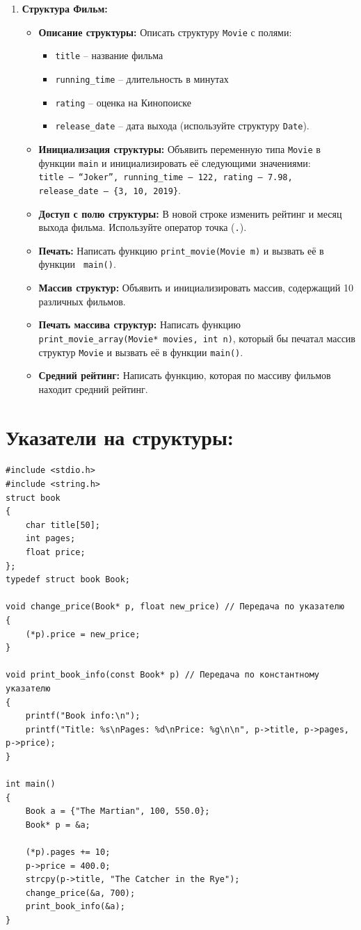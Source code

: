 \documentclass{article}
\begin{document}
\begin{enumerate}
\item \textbf{Структура Фильм:}
\begin{itemize}
\item \textbf{Описание структуры:} Описать структуру \texttt{Movie} с полями: 
\begin{itemize}
\item \texttt{title} -- название фильма
\item \texttt{running\_time} -- длительность в минутах
\item \texttt{rating} -- оценка на Кинопоиске
\item \texttt{release\_date} -- дата выхода (используйте структуру \texttt{Date}).
\end{itemize}
\item \textbf{Инициализация структуры:} Объявить переменную типа \texttt{Movie} в функции \texttt{main} и инициализировать её следующими значениями:\\
\texttt{title -- ``Joker'', running\_time -- 122, rating -- 7.98, release\_date -- \{3, 10, 2019\}}.
\item \textbf{Доступ с полю структуры:} В новой строке изменить рейтинг и месяц выхода фильма. Используйте оператор точка (\texttt{.}).
\item \textbf{Печать:} Написать функцию \texttt{print\_movie(Movie m)} и вызвать её в функции \texttt{ main()}.
\item \textbf{Массив структур:} Объявить и инициализировать массив, содержащий 10 различных фильмов.
\item \textbf{Печать массива структур:} Написать функцию \texttt{print\_movie\_array(Movie* movies, int n)}, который бы печатал массив структур \texttt{Movie} и вызвать её в функции \texttt{main()}.
\item \textbf{Средний рейтинг:} Написать функцию, которая по массиву фильмов находит средний рейтинг.
\end{itemize}
\end{enumerate}


\section*{Указатели на структуры:}

\begin{lstlisting}
#include <stdio.h>
#include <string.h>
struct book
{
    char title[50];
    int pages;
    float price;
};
typedef struct book Book;

void change_price(Book* p, float new_price) // Передача по указателю
{
	(*p).price = new_price;
}

void print_book_info(const Book* p) // Передача по константному указателю
{
    printf("Book info:\n");
    printf("Title: %s\nPages: %d\nPrice: %g\n\n", p->title, p->pages, p->price);
}

int main()
{
    Book a = {"The Martian", 100, 550.0};
    Book* p = &a;
    
    (*p).pages += 10;
    p->price = 400.0;
    strcpy(p->title, "The Catcher in the Rye");
    change_price(&a, 700);
    print_book_info(&a);
}
\end{lstlisting}
\end{document}

